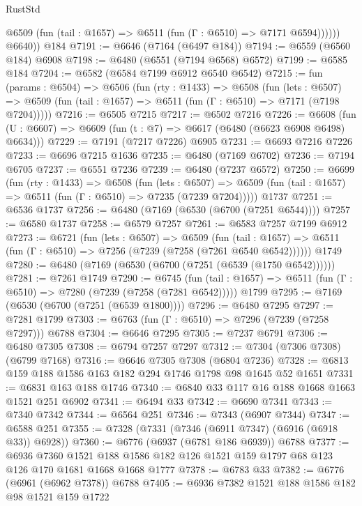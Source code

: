 \begin{lexlean}{RustStd}
\begin{coremodule}
              @6509 (fun (tail : @1657) => @6511 (fun (Γ : @6510) => @7171 @6594))))))
        @6640))
    @184
@7191 := @6646 (@7164 (@6497 @184))
@7194 := @6559 (@6560 @184) @6908
@7198 := @6480 (@6551 (@7194 @6568) @6572)
@7199 := @6585 @184
@7204 := @6582 (@6584 @7199 @6912 @6540 @6542)
@7215 := fun (params : @6504) =>
  @6506
    (fun (rty : @1433) =>
    @6508
      (fun (lets : @6507) =>
      @6509 (fun (tail : @1657) => @6511 (fun (Γ : @6510) => @7171 (@7198 @7204)))))
@7216 := @6505 @7215
@7217 := @6502 @7216
@7226 := @6608 (fun (U : @6607) => @6609 (fun (t : @7) => @6617 (@6480 (@6623 @6908 @6498) @6634)))
@7229 := @7191 (@7217 @7226) @6905
@7231 := @6693 @7216 @7226
@7233 := @6696 @7215 @1636
@7235 := @6480 (@7169 @6702)
@7236 := @7194 @6705
@7237 := @6551 @7236
@7239 := @6480 (@7237 @6572)
@7250 := @6699
    (fun (rty : @1433) =>
    @6508
      (fun (lets : @6507) =>
      @6509 (fun (tail : @1657) => @6511 (fun (Γ : @6510) => @7235 (@7239 @7204)))))
    @1737
@7251 := @6536 @1737
@7256 := @6480 (@7169 (@6530 (@6700 (@7251 @6544))))
@7257 := @6580 @1737
@7258 := @6579 @7257
@7261 := @6583 @7257 @7199 @6912
@7273 := @6721
    (fun (lets : @6507) =>
    @6509
      (fun (tail : @1657) => @6511 (fun (Γ : @6510) => @7256 (@7239 (@7258 (@7261 @6540 @6542))))))
    @1749
@7280 := @6480 (@7169 (@6530 (@6700 (@7251 (@6539 (@1750 @6542))))))
@7281 := @7261 @1749
@7290 := @6745
    (fun (tail : @1657) => @6511 (fun (Γ : @6510) => @7280 (@7239 (@7258 (@7281 @6542)))))
    @1799
@7295 := @7169 (@6530 (@6700 (@7251 (@6539 @1800))))
@7296 := @6480 @7295
@7297 := @7281 @1799
@7303 := @6763 (fun (Γ : @6510) => @7296 (@7239 (@7258 @7297))) @6788
@7304 := @6646 @7295
@7305 := @7237 @6791
@7306 := @6480 @7305
@7308 := @6794 @7257 @7297
@7312 := @7304 (@7306 @7308) (@6799 @7168)
@7316 := @6646 @7305 @7308 (@6804 @7236)
@7328 := @6813 @159 @188 @1586 @163 @182 @294 @1746 @1798 @98 @1645 @52 @1651
@7331 := @6831 @163 @188 @1746
@7340 := @6840 @33 @117 @16 @188 @1668 @1663 @1521 @251 @6902
@7341 := @6494 @33
@7342 := @6690 @7341
@7343 := @7340 @7342
@7344 := @6564 @251
@7346 := @7343 (@6907 @7344)
@7347 := @6588 @251
@7355 := @7328 (@7331 (@7346 (@6911 @7347) (@6916 (@6918 @33)) @6928))
@7360 := @6776 (@6937 (@6781 @186 @6939)) @6788
@7377 := @6936
    @7360
    @1521
    @188
    @1586
    @182
    @126
    @1521
    @159
    @1797
    @68
    @123
    @126
    @170
    @1681
    @1668
    @1668
    @1777
@7378 := @6783 @33
@7382 := @6776 (@6961 (@6962 @7378)) @6788
@7405 := @6936
    @7382
    @1521
    @188
    @1586
    @182
    @98
    @1521
    @159
    @1722

\end{coremodule}
\end{lexlean}
